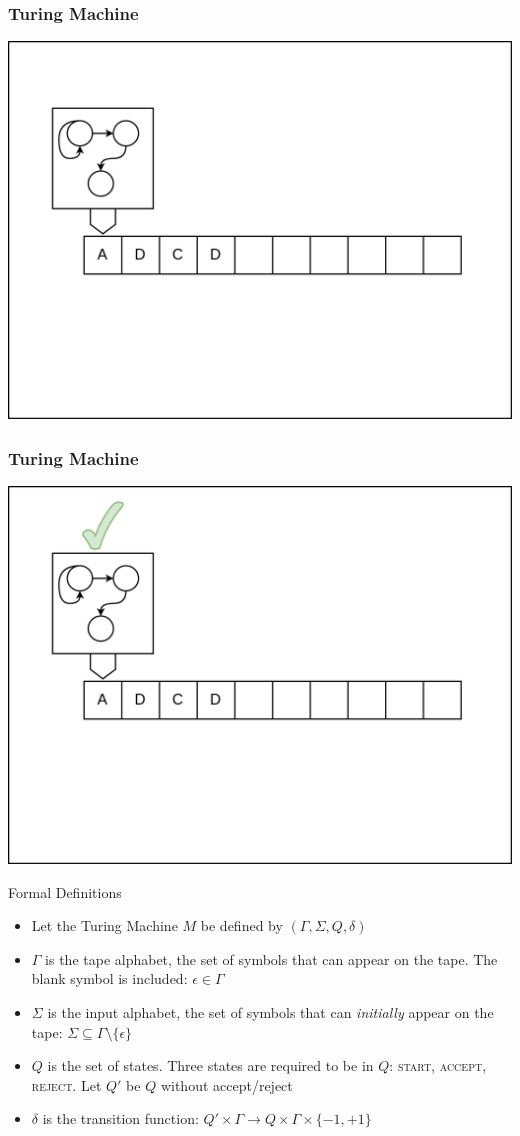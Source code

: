 \documentclass[aspectratio=169, handout]{beamer}
\begin{document}
\begin{frame}
  \frametitle{Turing Machine}
  \begin{center}
    \includegraphics[width=.75\textwidth]{frame4.png}
  \end{center}
\end{frame}

\begin{frame}
  \frametitle{Turing Machine}
  \begin{center}
    \includegraphics[width=.75\textwidth]{frame5.png}
  \end{center}
\end{frame}

\begin{frame}{Formal Definitions}
    \begin{itemize}
        \item Let the Turing Machine $M$ be defined by $(\Gamma, \Sigma, Q, \delta)$ \pause
        \item $\Gamma$ is the tape alphabet, the set of symbols that can appear on the tape. The blank symbol is included: $\epsilon \in \Gamma$ \pause
        \item $\Sigma$ is the input alphabet, the set of symbols that can \textit{initially} appear on the tape: $\Sigma \subseteq \Gamma \setminus \{\epsilon\}$ \pause
        \item $Q$ is the set of states. Three states are required to be in $Q$: \textsc{start, accept, reject}. Let $Q'$ be $Q$ without accept/reject \pause
        \item $\delta$ is the transition function: $Q' \times \Gamma \to Q \times \Gamma \times \{-1, +1\}$
    \end{itemize}
\end{frame}
\end{document}
